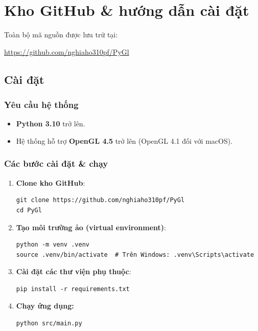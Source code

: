 \documentclass[a4paper]{article}
\begin{document}
\section{Kho GitHub \& hướng dẫn cài đặt}
\hspace{12pt}
Toàn bộ mã nguồn được lưu trữ tại:
\begin{center}
  \url{https://github.com/nghiaho310pf/PyGl}
\end{center}

\subsection{Cài đặt}
\subsubsection{Yêu cầu hệ thống}
\begin{itemize}
  \item \textbf{Python 3.10} trở lên.
  \item Hệ thống hỗ trợ \textbf{OpenGL 4.5} trở lên (OpenGL 4.1 đối với macOS).
\end{itemize}

\subsubsection{Các bước cài đặt \& chạy}
\begin{enumerate}
  \item \textbf{Clone kho GitHub}:
\begin{verbatim}
git clone https://github.com/nghiaho310pf/PyGl
cd PyGl
\end{verbatim}

  \item \textbf{Tạo môi trường ảo (virtual environment)}:
\begin{verbatim}
python -m venv .venv
source .venv/bin/activate  # Trên Windows: .venv\Scripts\activate
\end{verbatim}

  \item \textbf{Cài đặt các thư viện phụ thuộc}:
\begin{verbatim}
pip install -r requirements.txt
\end{verbatim}

  \item \textbf{Chạy ứng dụng:}
\begin{verbatim}
python src/main.py
\end{verbatim}
\end{enumerate}
\end{document}
